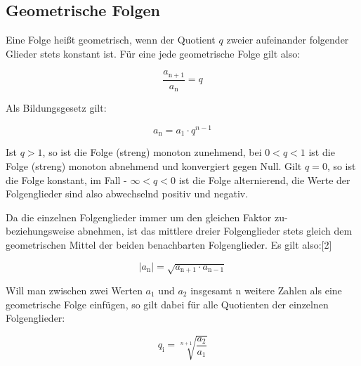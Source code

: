 \newpage
\subsection{Geometrische Folgen}

Eine Folge heißt geometrisch, wenn der Quotient $q$ zweier aufeinander folgender Glieder stets konstant ist.
Für eine jede geometrische Folge gilt also:

$$\frac{a_{\mathrm{n + 1}}}{ a_{\mathrm{n}} } = q$$

Als Bildungsgesetz gilt:

$$a_{\mathrm{n}} =  a_1 \cdot q ^{n-1}$$

Ist $q > 1$, so ist die Folge (streng) monoton zunehmend, bei $0 < q< 1$ ist die Folge (streng) monoton abnehmend und konvergiert gegen Null.
Gilt $q=0$, so ist die Folge konstant, im Fall - $\infty < q < 0$ ist die Folge alternierend, die Werte der Folgenglieder sind also abwechselnd positiv und negativ.

Da die einzelnen Folgenglieder immer um den gleichen Faktor zu- beziehungsweise abnehmen, ist das mittlere dreier Folgenglieder stets gleich dem geometrischen Mittel der beiden benachbarten Folgenglieder. Es gilt also:[2]

$$| a_{\mathrm{n}} | = \sqrt{a_{\mathrm{n+1}} \cdot a_{\mathrm{n-1}}}$$

Will man zwischen zwei Werten $a_1$ und $a_2$ insgesamt n weitere Zahlen als eine geometrische Folge einfügen, so gilt dabei für alle Quotienten der einzelnen Folgenglieder:

$$q_{\mathrm{i}} = \sqrt[n+1]{\frac{ a_2}{ a_1}}$$